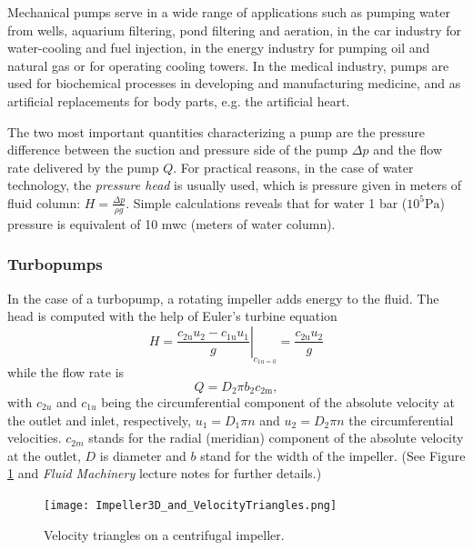 Mechanical pumps serve in a wide range of applications such as pumping water from wells, aquarium filtering, pond filtering and aeration, in the car industry for water-cooling and fuel injection, in the energy industry for pumping oil and natural gas or for operating cooling towers. In the medical industry, pumps are used for biochemical processes in developing and manufacturing medicine, and as artificial replacements for body parts, e.g. the artificial heart.

The two most important quantities characterizing a pump are the pressure difference between the suction and pressure side of the pump $\Delta p$ and the flow rate delivered by the pump $Q$. For practical reasons, in the case of water technology, the \emph{pressure head} is usually used, which is pressure given in meters of fluid column: $H=\frac{\Delta p}{\rho g}$. Simple calculations reveals that for water 1 bar ($10^5\mathrm{Pa}$) pressure is equivalent of 10 mwc (meters of water column).

\subsubsection{Turbopumps}

In the case of a turbopump, a rotating impeller adds energy to the fluid. The head is computed with the help of Euler's turbine equation
%
\begin{equation}
H = \left.\frac{c_{\mathrm{2u}}u_\mathrm{2}-c_{\mathrm{1u}}u_\mathrm{1}}{g}\right|_{c_{1u=0}} =\frac{c_{\mathrm{2u}}u_\mathrm{2}}{g}
\end{equation}
%
\noindent while the flow rate is 
%
\begin{equation}
Q = D_2 \pi b_2 c_{\mathrm{2m}},
\end{equation}
%
with $c_{2u}$ and $c_{1u}$ being the circumferential component of the absolute velocity at the outlet and inlet, respectively, $u_1=D_1 \pi n$ and $u_2=D_2 \pi n$ the circumferential velocities. $c_{2m}$ stands for the radial (meridian) component of the absolute velocity at the outlet, $D$ is diameter and $b$ stand for the width of the impeller. (See Figure \ref{fig:vel_triang} and \emph{Fluid Machinery} lecture notes for further details.)

\begin{figure}[h]
\begin{center}
\texttt{[image: Impeller3D\_and\_VelocityTriangles.png]}
\caption{\label{fig:vel_triang}Velocity triangles on a centrifugal impeller.}
\end{center}
\end{figure}

